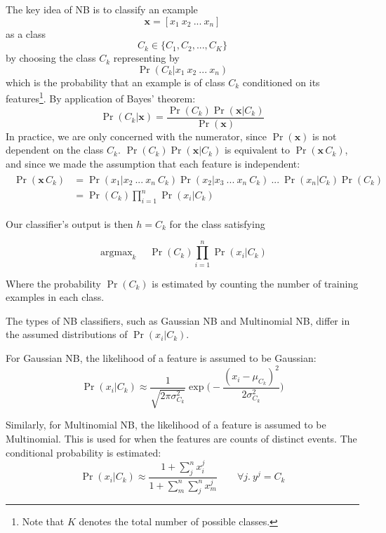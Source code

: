 \documentclass[12pt,a4paper,twoside,openright]{report}
\renewcommand{\vec}[1]{\mathbf{#1}}
\DeclareMathOperator*{\argmax}{argmax}
\begin{document}
The key idea of NB is to classify an example 
\begin{equation}
\vec{x} = [x_1\ x_2\ ...\ x_n]
\end{equation}
as a class 
\begin{equation}
C_k \in \{C_1, C_2, ..., C_K\}
\end{equation}
by choosing the class $C_k$ representing by
\begin{equation}
\Pr(C_k | x_1\ x_2\ ...\ x_n)
\end{equation}
which is the probability
that an example is of class $C_k$ conditioned on its features\footnote{Note that $K$ denotes the total number of possible classes.}.
By application of Bayes' theorem:
\begin{equation}
\Pr(C_k | \vec{x}) = \frac{\Pr(C_k)\Pr(\vec{x}|C_k)}{\Pr(\vec{x})}
\end{equation}
In practice, we are only concerned with the numerator, since $\Pr(\vec{x})$ is not dependent
on the class $C_k$. $\Pr(C_k)\Pr(\vec{x}|C_k)$ is equivalent to $\Pr(\vec{x}\, C_k)$, and 
since we made the assumption that each feature is independent:
\begin{align}
\begin{split}
\Pr(\vec{x}\, C_k) &= \Pr(x_1 | x_2\ ...\ x_n\ C_k)\Pr(x_2 | x_3\ ...\ x_n\ C_k)\ ...\ \Pr(x_n | C_k)\Pr(C_k)\\
&= \Pr(C_k)\prod_{i=1}^n \Pr(x_i | C_k)
\end{split}
\end{align}

Our classifier's output is then $h = C_k$ for the class satisfying

\begin{equation}
\argmax_k\quad \Pr(C_k)\prod_{i=1}^n \Pr(x_i | C_k)
\end{equation}

Where the probability $\Pr(C_k)$ is estimated by counting
the number of training examples in each class.

The types of NB classifiers, such as Gaussian NB and Multinomial NB,
differ in the assumed distributions of $\Pr(x_i | C_k)$. 

For Gaussian NB, the likelihood of a feature is assumed to be Gaussian:
\begin{equation}
	\Pr(x_i | C_k) \approx \frac{1}{\sqrt{2\pi\sigma_{C_k}^2}} \exp\bigg(-\frac{(x_i - \mu_{C_k})^2}{2\sigma_{C_k}^2}\bigg)
\end{equation}

Similarly, for Multinomial NB, the likelihood of a feature is assumed to be Multinomial. This is used
for when the features are counts of distinct events. The 
conditional probability is estimated\cite{Manning08}:
\begin{equation}
	\Pr(x_i | C_k) \approx \frac{1 + \sum_j^n x_i^j}{1 + \sum_m^n \sum_j^n x_m^j} \qquad \forall j.\ y^j=C_k
\end{equation}
\end{document}
